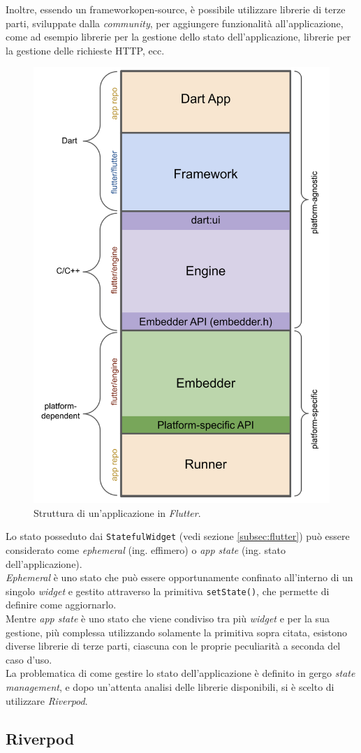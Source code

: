 Inoltre, essendo un \gls{framework}\glsoccur \gls{open-source}\glsoccur, è possibile utilizzare librerie di terze parti, sviluppate dalla \emph{community}, per aggiungere funzionalità all'applicazione, come ad esempio librerie per la gestione dello stato dell'applicazione, librerie per la gestione delle richieste HTTP, ecc.

\begin{figure}[!h] 
    \centering 
    \includegraphics[width=0.4\columnwidth]{images/flutter-app-anatomy.png} 
    \caption{Struttura di un'applicazione\cite{site:flutter-architecture} in \emph{Flutter}.}
    \label{fig:architettura-flutter}
\end{figure}

\newpage

Lo stato posseduto dai \lstinline{StatefulWidget} (vedi sezione \ref{subsec:flutter}) può essere considerato come \emph{ephemeral} (ing. effimero) o \emph{app state} (ing. stato dell'applicazione). \\
\emph{Ephemeral} è uno stato che può essere opportunamente confinato all'interno di un singolo \emph{widget} e gestito attraverso la primitiva \lstinline{setState()}, che permette di definire come aggiornarlo.\\
Mentre \emph{app state} è uno stato che viene condiviso tra più \emph{widget} e per la sua gestione, più complessa utilizzando solamente la primitiva sopra citata, esistono diverse librerie di terze parti, ciascuna con le proprie peculiarità a seconda del caso d'uso.\\
La problematica di come gestire lo stato dell'applicazione è definito in gergo \emph{state management}\cite{site:flutter-state-mgmt}, e dopo un'attenta analisi delle librerie disponibili, si è scelto di utilizzare \emph{Riverpod}\cite{site:riverpod}.
\subsection{Riverpod}
\label{subsec:riverpod}

